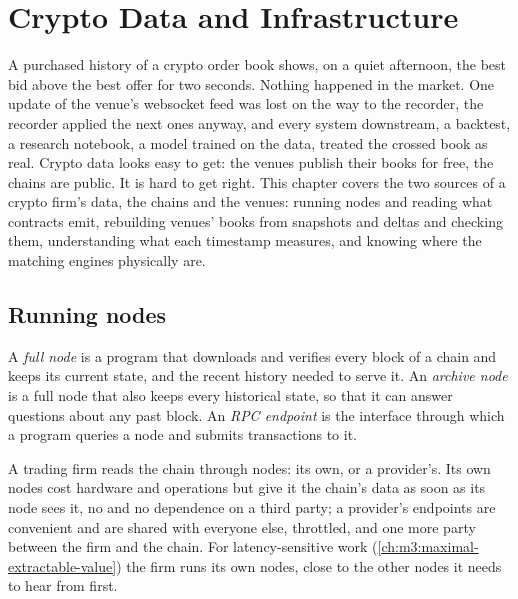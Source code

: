 \chapter{Crypto Data and Infrastructure}\label{ch:m3:crypto-data-and-infrastructure}

A purchased history of a crypto order book shows, on a quiet afternoon, the best bid above the best offer
for two seconds. Nothing happened in the market. One update of the venue's websocket feed was lost on the
way to the recorder, the recorder applied the next ones anyway, and every system downstream, a backtest,
a research notebook, a model trained on the data, treated the crossed book as real. Crypto data looks easy
to get: the venues publish their books for free, the chains are public. It is hard to get right. This
chapter covers the two sources of a crypto firm's data, the chains and the venues: running nodes and
reading what contracts emit, rebuilding venues' books from snapshots and deltas and checking them,
understanding what each timestamp measures, and knowing where the matching engines physically are.

\section{Running nodes}

\begin{definition}\label{def:m3:crypto-data-and-infrastructure:node}
A \emph{full node} is a program that downloads and verifies every block of a chain and keeps its current
state, and the recent history needed to serve it. An \emph{archive node} is a full node that also keeps
every historical state, so that it can answer questions about any past block. An \emph{RPC endpoint} is the
interface through which a program queries a node and submits transactions to it.
\end{definition}

A trading firm reads the chain through nodes: its own, or a provider's. Its own nodes cost hardware and operations but give it
the chain's data as soon as its node sees it, no  and no dependence on a third party; a provider's endpoints are
convenient and are shared with everyone else, throttled, and one more party between the firm and the chain. For latency-sensitive
work (\cref{ch:m3:maximal-extractable-value}) the firm runs its own nodes, close to the other nodes it needs to hear from first.

